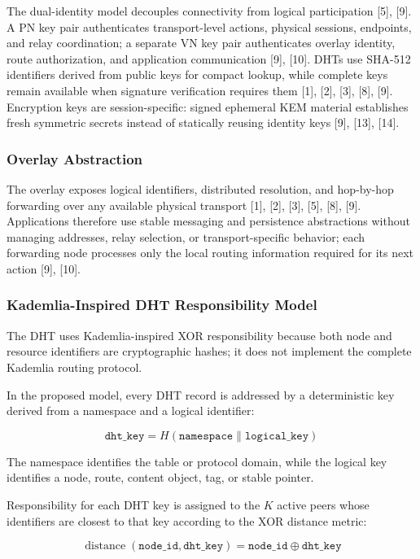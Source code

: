 \documentclass[12pt,a4paper]{article}
\begin{document}
The dual-identity model decouples connectivity from logical participation [5], [9]. A PN key pair authenticates transport-level actions, physical sessions, endpoints, and relay coordination; a separate VN key pair authenticates overlay identity, route authorization, and application communication [9], [10]. DHTs use SHA-512 identifiers derived from public keys for compact lookup, while complete keys remain available when signature verification requires them [1], [2], [3], [8], [9]. Encryption keys are session-specific: signed ephemeral KEM material establishes fresh symmetric secrets instead of statically reusing identity keys [9], [13], [14].

\subsubsection{Overlay Abstraction}

The overlay exposes logical identifiers, distributed resolution, and hop-by-hop forwarding over any available physical transport [1], [2], [3], [5], [8], [9]. Applications therefore use stable messaging and persistence abstractions without managing addresses, relay selection, or transport-specific behavior; each forwarding node processes only the local routing information required for its next action [9], [10].


\subsubsection{Kademlia-Inspired DHT Responsibility Model}

The DHT uses Kademlia-inspired XOR responsibility because both node and resource identifiers are cryptographic hashes; it does not implement the complete Kademlia routing protocol.

In the proposed model, every DHT record is addressed by a deterministic key derived
from a namespace and a logical identifier:

\[
\texttt{dht\_key} = H(\texttt{namespace} \parallel \texttt{logical\_key})
\]

The namespace identifies the table or protocol domain, while the logical key identifies a node, route, content object, tag, or stable pointer.

Responsibility for each DHT key is assigned to the \(K\) active peers whose
identifiers are closest to that key according to the XOR distance metric:

\[
\operatorname{distance}(\texttt{node\_id}, \texttt{dht\_key}) = \texttt{node\_id} \oplus \texttt{dht\_key}
\]
\end{document}
